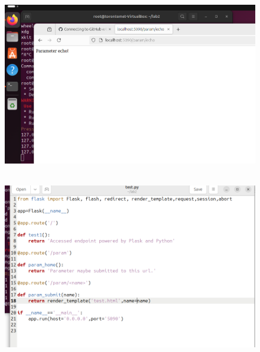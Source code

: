 \documentclass[letterpaper,11pt]{texMemo2} %
\begin{document}
	\begin{figure}[htp]
		\centering 
		
			\includegraphics[clip,width=0.9\columnwidth,height=8cm]{10C}%
		\\
		
			\includegraphics[clip,width=0.9\columnwidth,height=8cm]{11}%
		
		
		
	\end{figure}
	
\end{document}
